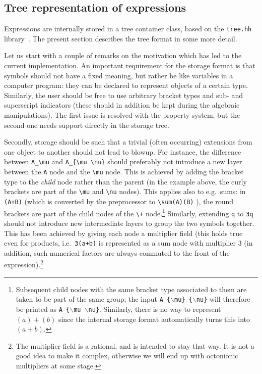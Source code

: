 \documentclass[11pt]{article}
\numberwithin{equation}{section}
\begin{document}
\subsection{Tree representation of expressions}
\label{s:internal_storage}

Expressions are internally stored in a tree container class, based on
the {\tt tree.hh} library~\cite{kas_tree}. The present section
describes the tree format in some more detail. 

Let us start with a couple of remarks on the motivation which has led
to the current implementation. An important requirement for the
storage format is that symbols should not have a fixed meaning, but
rather be like variables in a computer program: they can be declared
to represent objects of a certain type. Similarly, the user should be
free to use arbitrary bracket types and sub- and superscript
indicators (these should in addition be kept during the algebraic
manipulations). The first issue is resolved with the property system,
but the second one needs support directly in the storage tree.

Secondly, storage should be such that a trivial (often occurring)
extensions from one object to another should not lead to blowup. For
instance, the difference between \verb|A_\mu| and \verb|A_{\mu \nu}|
should preferably not introduce a new layer between the \verb|A| node
and the \verb|\mu| node. This is achieved by adding the bracket type
to the \emph{child} node rather than the parent (in the example above,
the curly brackets are part of the \verb|\mu| and \verb|\nu|
nodes). This applies also to e.g.~sums: in \verb|(A+B)| (which is
converted by the preprocessor to \verb|\sum(A)(B)| ), the round
brackets are part of the child nodes of the \verb|\+|
node.\footnote{Subsequent child nodes with the same bracket type
associated to them are taken to be part of the same group; the input
{\tt A\_\{$\backslash$mu\}\_\{$\backslash$nu\}} will therefore be
printed as {\tt A\_\{$\backslash$mu $\backslash$nu\}}. Similarly,
there is no way to represent $(a)+(b)$ since the internal storage
format automatically turns this into $(a+b)$.} Similarly, extending
\verb|q| to \verb|3q| should not introduce new intermediate layers to
group the two symbols together. This has been achieved by giving each
node a multiplier field (this holds true even for products,
i.e.~\verb|3(a+b)| is represented as a sum node with multiplier 3 (in
addition, such numerical factors are always commuted to the front of
the expression).\footnote{The multiplier field is a rational, and is
  intended to stay that way. It is not a good idea to make it
  complex, otherwise we will end up with octonionic multipliers at 
some stage. }
\end{document}
